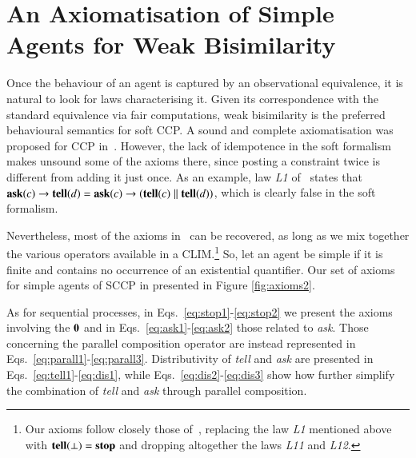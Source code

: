\documentclass[main.tex]{subfiles}
\begin{document}
\section{An Axiomatisation of Simple Agents for Weak Bisimilarity}\label{sec:axiomatiastion}
Once the behaviour of an agent is captured by an observational equivalence, 
it is natural to look for laws characterising it. 
Given its correspondence with the standard equivalence via fair computations,
weak bisimilarity is the preferred behavioural semantics for soft CCP. 
%
A sound and complete axiomatisation was proposed for CCP in~\cite{popl91}. 
%
However, the lack of idempotence in the soft formalism makes unsound some of the axioms  
there, since posting a constraint twice is different from adding it just
once. 
As an example, law \emph{L1} of~\cite{popl91} states that
${\bf ask}(c) \rightarrow {\bf tell}(d) = {\bf ask}(c) \rightarrow ({\bf tell}(c) \parallel {\bf tell}(d))$, 
which is clearly false in the soft formalism.

Nevertheless, most of the axioms in~\cite{popl91} can be recovered, as long as we mix together
the various operators available in a CLIM.\footnote{Our axioms follow closely those of~\cite[p.341]{popl91},
replacing  the law \emph{L1} mentioned above with ${\bf tell}(\bot) = {\bf stop}$ and dropping altogether the laws 
\emph{L11} and \emph{L12}.}
%
So, let an agent be simple if it is finite and contains no occurrence of an existential quantifier.
Our set of axioms for simple agents of SCCP in presented in Figure \ref{fig:axioms2}. 

As for sequential processes, in Eqs.~\ref{eq:stop1}-\ref{eq:stop2} we present the axioms involving the ${\mathbf 0}$
and in Eqs.~\ref{eq:ask1}-\ref{eq:ask2} those related to \emph{ask}.
Those concerning the parallel composition operator are instead represented in Eqs.~\ref{eq:parall1}-\ref{eq:parall3}. 
Distributivity of \emph{tell} and \emph{ask} are presented in Eqs.~\ref{eq:tell1}-\ref{eq:dis1},
while Eqs.~\ref{eq:dis2}-\ref{eq:dis3}  show how further simplify the combination of
\emph{tell} and \emph{ask} through parallel composition. 
\end{document}
